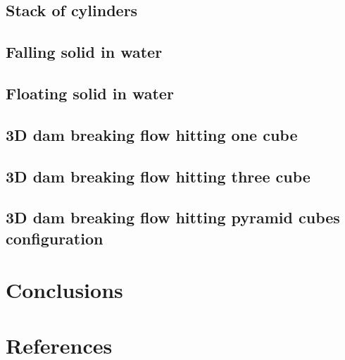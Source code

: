 \documentclass[preprint,12pt]{elsarticle}
\begin{document}
\subsection{Stack of cylinders}
\label{sec:stack-of-cylinders}



\subsection{Falling solid in water}
\label{sec:falling-solid-in-water}


\subsection{Floating solid in water}
\label{sec:floating-solid-in-water}


\subsection{3D dam breaking flow hitting one cube}
\label{sec:3d-dam-breaking-one-cube-hit}

\cite{amaro2019improvement}

\subsection{3D dam breaking flow hitting three cube}
\label{sec:3d-dam-breaking-one-cube-hit}

\cite{amaro2019improvement}

\subsection{3D dam breaking flow hitting pyramid cubes configuration}
\label{sec:3d-dam-breaking-one-cube-hit}

\cite{amaro2019improvement}








\section{Conclusions}
\label{sec:conclusions}

\section*{References}


\end{document}
